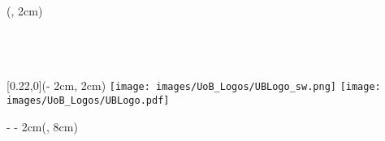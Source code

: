 \begin{titlepage}

	\begin{textblock*}{\textwidth}(\coverborderleft, 2cm)%
		\setlength{\baselineskip}{11pt}%
		\ifx \monochromeCover \undefined
			\textcolor{UniversitaetFarbe} { %
				\fontsize{9}{11}\selectfont%
				\sffamily \chair\\%
				\sffamily \faculty\\%
				\sffamily \uni }
		\else
			\textcolor{black} { %
				\fontsize{9}{11}\selectfont%
				\sffamily \chair\\%
				\sffamily \faculty\\%
				\sffamily \uni }
		\fi
	\end{textblock*}%

	\begin{textblock*}{\UniversitaetLogoHoehe}[0.22,0](\paperwidth - 2cm, 2cm)%
		\ifx \monochromeCoverInside \undefined
			\texttt{[image: images/UoB\_Logos/UBLogo\_sw.png]}%
		\else
			\texttt{[image: images/UoB\_Logos/UBLogo.pdf]}%
		\fi
	\end{textblock*}%

	\begin{textblock*}{\paperwidth - \coverborderleft - 2cm}(\coverborderleft , 8cm)%
		\raggedright %
		{\sffamily \Large \worktype}\\
		{\sffamily \huge \titleFirstLanguage \par} %
		\vspace{1cm}
		\sffamily \Large \textbf{\authorname}\\
	\end{textblock*}

	~\\ %
\end{titlepage}